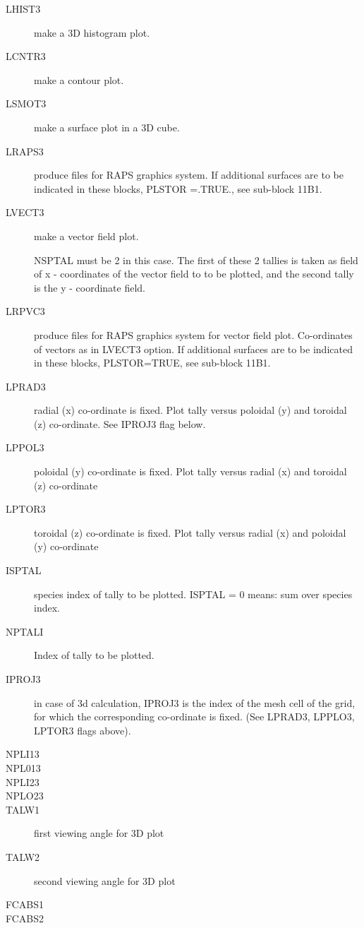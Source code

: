 \begin{description}
  \item[LHIST3] make a 3D histogram plot.
  \item[LCNTR3] make a contour plot.
  \item[LSMOT3] make a surface plot in a 3D cube.
  \item[LRAPS3] produce files for RAPS graphics system.
        If additional surfaces are to be indicated in these blocks, PLSTOR =.TRUE., see
        sub-block 11B1.
  \item[LVECT3] make a vector field plot.

        NSPTAL must be 2 in this case.
        The first of these 2 tallies is taken as field of x - coordinates of the vector
        field to to be plotted, and the second tally is the y - coordinate field.
  \item[LRPVC3] produce files for RAPS graphics system for vector field plot.
        Co-ordinates of vectors as in LVECT3 option.
        If additional surfaces are to be indicated in these blocks, PLSTOR=TRUE, see
        sub-block 11B1.

  \item[LPRAD3] radial (x) co-ordinate is fixed.
        Plot tally versus poloidal (y) and toroidal (z) co-ordinate.
        See IPROJ3 flag below.
  \item[LPPOL3] poloidal (y) co-ordinate is fixed.
        Plot tally versus radial (x) and toroidal (z) co-ordinate
  \item[LPTOR3]
        toroidal (z) co-ordinate is fixed.
        Plot tally versus radial (x) and poloidal (y) co-ordinate
  \item[ISPTAL] species
        index of tally to be plotted.
        ISPTAL = 0 means: sum over species index.
  \item[NPTALI] Index of tally to be plotted.
  \item[IPROJ3] in case of 3d calculation, IPROJ3 is the index of the mesh cell
        of the grid, for which the corresponding co-ordinate is fixed.
        (See LPRAD3, LPPLO3, LPTOR3 flags above).
  \item[NPLI13]
  \item[NPL013]
  \item[NPLI23]
  \item[NPLO23]
  \item[TALW1]
        first viewing angle for 3D plot
  \item[TALW2]
        second viewing angle for 3D plot
  \item[FCABS1]
  \item[FCABS2]
\end{description}
